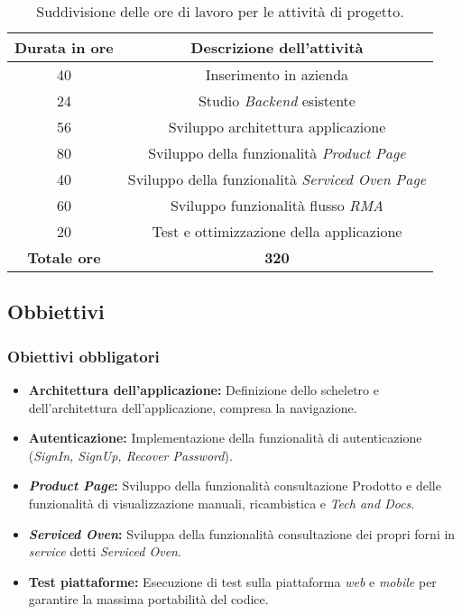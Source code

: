 \begin{table}[ht]
    \centering
    \begin{tabular}{c|c}
    \hline\hline
    \textbf{Durata in ore} & \textbf{Descrizione dell'attività} \\
    \hline\hline
    40 & Inserimento in azienda \\
    \hline
    24 & Studio \textit{Backend} esistente \\
    \hline
    56 & Sviluppo architettura applicazione\\
    \hline
    80 & Sviluppo della funzionalità \textit{Product Page} \\
    \hline
    40 & Sviluppo della funzionalità \textit{Serviced Oven Page} \\
    \hline
    60 & Sviluppo funzionalità flusso \textit{RMA} \\
    \hline
    20 & Test e ottimizzazione della applicazione \\
    \hline
    \textbf{Totale ore} & \textbf{320} \\
    \hline\hline
    \end{tabular}
    \caption{Suddivisione delle ore di lavoro per le attività di progetto.}
    \label{tab:ore-lavoro}
    \end{table}

\subsection{Obbiettivi}
\subsubsection{Obiettivi obbligatori}
\begin{itemize}
    \item \textbf{Architettura dell'applicazione:} Definizione dello scheletro e dell'architettura dell'applicazione, compresa la navigazione.
    \item \textbf{Autenticazione: } Implementazione della funzionalità di autenticazione (\textit{SignIn, SignUp, Recover Password}).
    \item \textbf{\textit{Product Page}: }Sviluppo della funzionalità consultazione Prodotto e delle funzionalità di visualizzazione manuali, ricambistica e \textit{Tech and Docs}.
    \item \textbf{\textit{Serviced Oven}: }Sviluppa della funzionalità consultazione dei propri forni in \textit{service} detti \textit{Serviced Oven}.
    \item \textbf{Test piattaforme: } Esecuzione di test sulla piattaforma \textit{web} e \textit{mobile} per garantire la massima portabilità del codice.

\end{itemize}

